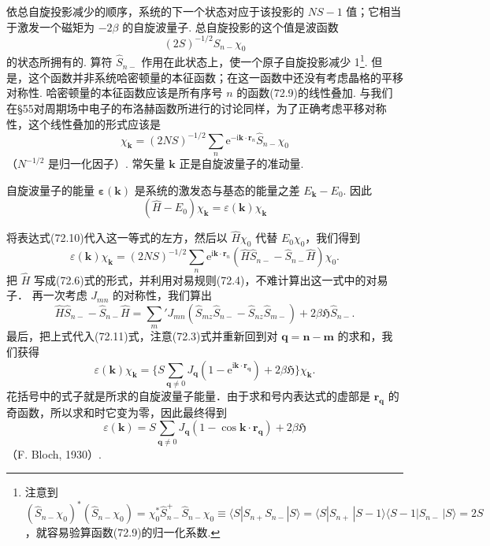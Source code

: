 依总自旋投影减少的顺序，系统的下一个状态对应于该投影的 $NS-1$ 值；它相当于激发一个磁矩为 $-2\beta$ 的自旋波量子. 总自旋投影的这个值是波函数
\begin{equation}
(2S)^{-1/2}\hat{S}_{n-}\chi_0
\end{equation}
的状态所拥有的. 算符 $\hat{S}_{n-}$ 作用在此状态上，使一个原子自旋投影减少 1\footnote{注意到 $(\hat{S}_{n-}\chi_0)^{*}(\hat{S}_{n-}\chi_0)=\chi_0^{*}\hat{S}_{n-}^{+}\hat{S}_{n-}\chi_0\equiv\langle S|S_{n+}S_{n-}|S\rangle=\langle S|S_{n+}\,|S-1\rangle\langle S-1|S_{n-}\,|S\rangle=2S$，就容易验算函数(72.9)的归一化系数.}. 但是，这个函数并非系统哈密顿量的本征函数；在这一函数中还没有考虑晶格的平移对称性. 哈密顿量的本征函数应该是所有序号 $n$ 的函数(72.9)的线性叠加. 与我们在§55对周期场中电子的布洛赫函数所进行的讨论同样，为了正确考虑平移对称性，这个线性叠加的形式应该是
\begin{equation}
\chi_{\bm{k}}=(2NS)^{-1/2}\sum_n\mathrm{e}^{-\mathrm{i}\bm{k}\cdot\bm{r}_n}
\hat{S}_{n-}\chi_0
\end{equation}
（$N^{-1/2}$ 是归一化因子）. 常矢量 $\bm{k}$ 正是自旋波量子的准动量.

自旋波量子的能量 $\bm{\varepsilon}(\bm{k})$ 是系统的激发态与基态的能量之差 $E_{\bm{k}}-E_0$. 因此
\begin{equation*}
(\hat{H}-E_0)\chi_{\bm{k}}=\varepsilon(\bm{k})\chi_{\bm{k}}
\end{equation*}

将表达式(72.10)代入这一等式的左方，然后以 $\hat{H}\chi_0$ 代替 $E_0\chi_0$，我们得到
\begin{equation}
\varepsilon(\bm{k})\chi_{\bm{k}}=(2NS)^{-1/2}\sum_n
\mathrm{e}^{\mathrm{i}\bm{k}\cdot\bm{r}_n}
(\hat{H}\hat{S}_{n-}-\hat{S}_{n-}\hat{H})\chi_0.
\end{equation}
把 $\hat{H}$ 写成(72.6)式的形式，并利用对易规则(72.4)，不难计算出这一式中的对易子． 再一次考虑 $J_{mn}$ 的对称性，我们算出
\begin{equation}
\hat{H}\hat{S}_{n-}-\hat{S}_{n-}\hat{H}
=\sum_m{}'J_{mn}(\hat{S}_{mz}\hat{S}_{n-}-\hat{S}_{nz}\hat{S}_{m-})
+2\beta\mathfrak{H}\hat{S}_{n-}.
\end{equation}
最后，把上式代入(72.11)式，注意(72.3)式并重新回到对 $\bm{q}=\bm{n}-\bm{m}$ 的求和，我们获得
\begin{equation*}
\varepsilon(\bm{k})\chi_{\bm{k}}=\biggl\{
S\sum_{\bm{q}\neq0}J_{\bm{q}}(1-\mathrm{e}^{\mathrm{i}\bm{k}\cdot\bm{r}_{\bm{q}}})
+2\beta\mathfrak{H}\biggr\}\chi_{\bm{k}}.
\end{equation*}
花括号中的式子就是所求的自旋波量子能量．由于求和号内表达式的虚部是 $\bm{r}_{\bm{q}}$ 的奇函数，所以求和时它变为零，因此最终得到
\begin{equation}
\varepsilon(\bm{k})=S\sum_{\bm{q}\neq0}J_{\bm{q}}
(1-\cos\bm{k}\cdot\bm{r}_{\bm{q}})+2\beta\mathfrak{H}
\end{equation}
（F. Bloch, 1930）.

